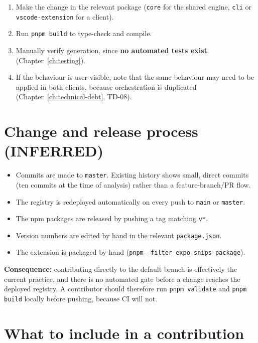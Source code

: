 \begin{enumerate}
  \item Make the change in the relevant package (\texttt{core} for the shared
        engine, \texttt{cli} or \texttt{vscode-extension} for a client).
  \item Run \texttt{pnpm build} to type-check and compile.
  \item Manually verify generation, since \textbf{no automated tests exist}
        (Chapter~\ref{ch:testing}).
  \item If the behaviour is user-visible, note that the same behaviour may need
        to be applied in both clients, because orchestration is duplicated
        (Chapter~\ref{ch:technical-debt}, TD-08).
\end{enumerate}

\section{Change and release process (INFERRED)}

\begin{itemize}
  \item Commits are made to \texttt{master}. Existing history shows small,
        direct commits (ten commits at the time of analysis) rather than a
        feature-branch/PR flow.
  \item The registry is redeployed automatically on every push to
        \texttt{main} or \texttt{master}.
  \item The npm packages are released by pushing a tag matching \texttt{v*}.
  \item Version numbers are edited by hand in the relevant
        \texttt{package.json}.
  \item The extension is packaged by hand
        (\texttt{pnpm --filter expo-snips package}).
\end{itemize}

\textbf{Consequence:} contributing directly to the default branch is effectively
the current practice, and there is no automated gate before a change reaches the
deployed registry. A contributor should therefore run \texttt{pnpm validate} and
\texttt{pnpm build} locally before pushing, because CI will not.

\section{What to include in a contribution}

